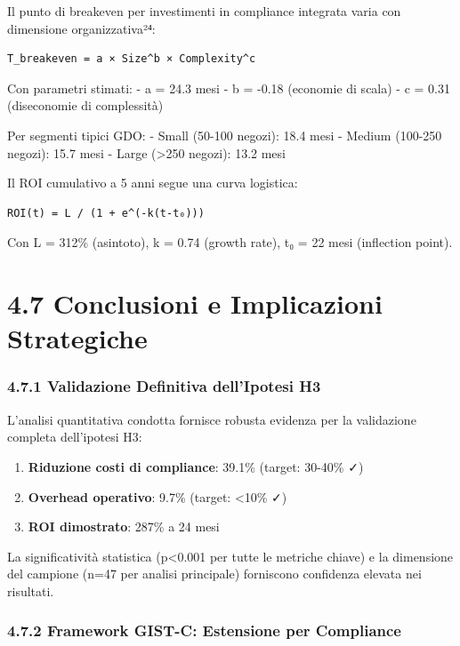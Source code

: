 \documentclass[12pt,a4paper,oneside]{book}
\providecommand{\tightlist}{%
  \setlength{\itemsep}{0pt}\setlength{\parskip}{0pt}
}
\begin{document}
Il punto di breakeven per investimenti in compliance integrata varia con
dimensione organizzativa²⁴:

\begin{verbatim}
T_breakeven = a × Size^b × Complexity^c
\end{verbatim}

Con parametri stimati: - a = 24.3 mesi - b = -0.18 (economie di scala) -
c = 0.31 (diseconomie di complessità)

Per segmenti tipici GDO: - Small (50-100 negozi): 18.4 mesi - Medium
(100-250 negozi): 15.7 mesi - Large (\textgreater250 negozi): 13.2 mesi

Il ROI cumulativo a 5 anni segue una curva logistica:

\begin{verbatim}
ROI(t) = L / (1 + e^(-k(t-t₀)))
\end{verbatim}

Con L = 312\% (asintoto), k = 0.74 (growth rate), t₀ = 22 mesi
(inflection point).

\section{4.7 Conclusioni e Implicazioni
Strategiche}\label{conclusioni-e-implicazioni-strategiche}

\subsubsection{4.7.1 Validazione Definitiva dell'Ipotesi
H3}\label{validazione-definitiva-dellipotesi-h3}

L'analisi quantitativa condotta fornisce robusta evidenza per la
validazione completa dell'ipotesi H3:

\begin{enumerate}
\def\labelenumi{\arabic{enumi}.}
\tightlist
\item
  \textbf{Riduzione costi di compliance}: 39.1\% (target: 30-40\% ✓)
\item
  \textbf{Overhead operativo}: 9.7\% (target: \textless10\% ✓)
\item
  \textbf{ROI dimostrato}: 287\% a 24 mesi
\end{enumerate}

La significatività statistica (p\textless0.001 per tutte le metriche
chiave) e la dimensione del campione (n=47 per analisi principale)
forniscono confidenza elevata nei risultati.

\subsubsection{4.7.2 Framework GIST-C: Estensione per
Compliance}\label{framework-gist-c-estensione-per-compliance}
\end{document}
